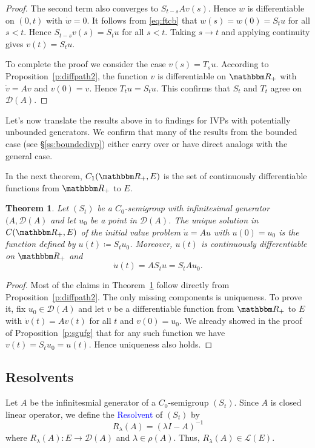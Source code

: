 \documentclass[12pt, reqno]{amsart}
\newcommand{\1}{\mathbbm 1}
\newcommand{\dD}{\mathcal D}
\newcommand{\RR}{\mathbbm R}
\theoremstyle{plain}
\newtheorem{theorem}{Theorem}[section]
\theoremstyle{definition}
\newcommand{\navy}[1]{\textcolor{blue}{#1}}
\begin{document}
\begin{proof}
    The second term also converges to
    $S_{t-s} A v(s)$. Hence $w$ is differentiable on $(0, t)$ with $\dot w = 0$.
    It follows from \eqref{eq:ftcb} that $w(s) = w(0) = S_t u$ for all $s < t$.
    Hence $S_{t-s} v(s) = S_t u$ for all $s < t$.  Taking $s \to t$ and applying
    continuity gives $v(t) = S_t u$.  

    To complete the proof we consider the case $v(s) = T_s u$.  According to
    Proposition~\ref{p:diffpath2}, the function $v$ is differentiable on $\RR_+$
    with $\dot v = A v$ and $v(0) = v$. Hence $T_t u = S_t u$.
    This confirms that $S_t$ and $T_t$ agree on $\dD(A)$.
\end{proof}



Let's now translate the results above in to findings for IVPs with potentially
unbounded generators.  We confirm that many of the results from the bounded
case (see \S\ref{ss:boundedivp}) either carry over or have direct analogs with
the general case.

In the next theorem, $C_1(\RR_+, E)$ is the set of continuously differentiable
functions from $\RR_+$ to $E$.

\begin{theorem}\label{t:ivps}
    Let $(S_t)$ be a $C_0$-semigroup with infinitesimal generator $(A, \dD(A)$
    and let $u_0$ be a point in $\dD(A)$.  The unique solution in $C(\RR_+, E)$
    of the initial value problem $\dot u = A u$ with $u(0) = u_0$ is the
    function defined by $u(t) \coloneq S_t u_0$. Moreover, $u(t)$ is continuously
    differentiable on $\RR_+$ and 
    \begin{equation*}
       \dot u(t) = A S_t u = S_t A u_0.
    \end{equation*}
\end{theorem}

\begin{proof}
    Most of the claims in Theorem~\ref{t:ivps} follow directly from
    Proposition~\ref{p:diffpath2}.  The only missing components is uniqueness.
    To prove it, fix $u_0 \in \dD(A)$ and let $v$ be a differentiable function from
    $\RR_+$ to $E$ with $\dot v(t) = A v (t)$ for all $t$ and $v(0) = u_0$.
    We already showed in the proof of Proposition~\ref{p:sgufg} that for any
    such function we have $v(t) = S_t u_0 = u(t)$.  Hence uniqueness also holds.
\end{proof}



\subsection{Resolvents} 
Let $A$ be the infinitesmial generator of a $C_0$-semigroup $(S_t)$. Since $A$ is closed linear operator, we define the \navy{Resolvent} of $(S_t)$ by
$$R_{\lambda}(A)=(\lambda I-A)^{-1}$$
where $R_{\lambda}(A): E\rightarrow\dD(A)$ and $\lambda\in\rho(A)$. Thus, $R_{\lambda}(A) \in\mathcal{L}(E)$.
\end{document}
